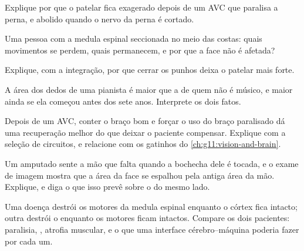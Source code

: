 \begin{exercise}[$\star\star$]\label{exo:g12:brain-and-movement:8}
Explique por que o  patelar fica exagerado depois de um AVC que
paralisa a perna, e abolido quando o nervo da perna é cortado.
\end{exercise}

\begin{exercise}[$\star\star$]\label{exo:g12:brain-and-movement:9}
Uma pessoa com a medula espinal seccionada no meio das costas: quais
movimentos se perdem, quais  permanecem, e por que a face não é
afetada?
\end{exercise}

\begin{exercise}[$\star\star$]\label{exo:g12:brain-and-movement:10}
Explique, com a integração, por que cerrar os punhos deixa o 
patelar mais forte.
\end{exercise}

\begin{exercise}[$\star\star$]\label{exo:g12:brain-and-movement:11}
A área dos dedos de uma pianista é maior que a de quem não é músico, e
maior ainda se ela começou antes dos sete anos. Interprete os dois fatos.
\end{exercise}

\begin{exercise}[$\star\star\star$]\label{exo:g12:brain-and-movement:12}
Depois de um AVC, conter o braço bom e forçar o uso do braço paralisado
dá uma recuperação melhor do que deixar o paciente compensar. Explique
com a seleção de circuitos, e relacione com os gatinhos do
\cref{ch:g11:vision-and-brain}.
\end{exercise}

\begin{exercise}[$\star\star\star$]\label{exo:g12:brain-and-movement:13}
Um amputado sente a mão que falta quando a bochecha dele é tocada, e o
exame de imagem mostra que a área da face se espalhou pela antiga área
da mão. Explique, e diga o que isso prevê sobre o  do mesmo lado.
\end{exercise}

\begin{exercise}[$\star\star\star$]\label{exo:g12:brain-and-movement:14}
Uma doença destrói os  motores da medula espinal enquanto o
córtex fica intacto; outra destrói o  enquanto os 
motores ficam intactos. Compare os dois pacientes: paralisia, ,
atrofia muscular, e o que uma interface cérebro--máquina poderia fazer
por cada um.
\end{exercise}

